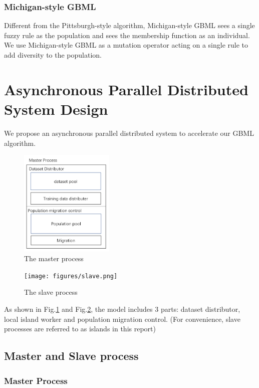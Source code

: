 \documentclass[conference]{IEEEtran}
\begin{document}
	 \subsubsection{Michigan-style GBML}
	 
   Different from the Pittsburgh-style algorithm, Michigan-style GBML sees a single fuzzy rule as the population and sees the membership function as an individual. We use Michigan-style GBML as a mutation operator acting on a single rule to add diversity to the population. 
   
  
   
  \section{Asynchronous Parallel Distributed System Design}
  We propose an asynchronous parallel distributed system to accelerate our GBML algorithm. 


  \begin{figure}[H]
    \centering
    \includegraphics[width = 0.4\textwidth]{figures/master.png}
    \caption{The master process}
    \label{fig:master}
  \end{figure}

  \begin{figure}[H]
    \centering
    \texttt{[image: figures/slave.png]}
    \caption{The slave process}
    \label{fig:slave}
  \end{figure}
  
  As shown in Fig.\ref{fig:master} and Fig.\ref{fig:slave}, the model includes 3 parts: dataset distributor, local island worker and population migration control. (For convenience, slave processes are referred to as islands in this report)
   
  \subsection{Master and Slave process}
  \subsubsection{Master Process}
  
\end{document}

